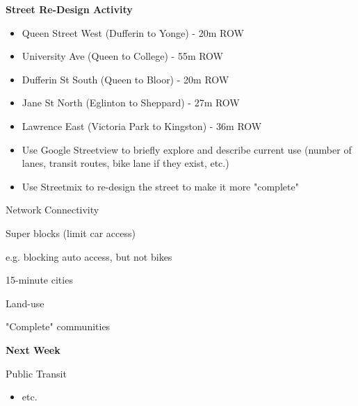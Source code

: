 \documentclass[aspectratio=169]{beamer}
\begin{document}
\begin{frame}
	
	\textbf{Street Re-Design Activity}


	\vspace{4mm}
	
	\begin{itemize}
		\item Queen Street West (Dufferin to Yonge) - 20m ROW
		\item University Ave (Queen to College) - 55m ROW
		\item Dufferin St South (Queen to Bloor) - 20m ROW
		\item Jane St North (Eglinton to Sheppard) - 27m ROW
		\item Lawrence East (Victoria Park to Kingston) - 36m ROW
	\end{itemize}

	
	\vspace{4mm}
	
	
	\begin{itemize}
		\item Use Google Streetview to briefly explore and describe current use (number of lanes, transit routes, bike lane if they exist, etc.)
		\item Use Streetmix to re-design the street to make it more "complete"
	\end{itemize}
	
\end{frame}



\begin{frame}
	
	Network Connectivity
	
\end{frame}



\begin{frame}
	
	Super blocks (limit car access)
	
	e.g. blocking auto access, but not bikes
	
\end{frame}



\begin{frame}
	
	15-minute cities
	
	Land-use
	
	"Complete" communities
		
\end{frame}




\begin{frame}
	\textbf{Next Week} 
	
	\vspace{4mm}
	
	Public Transit
	
	\begin{itemize}
				
		
		\item etc.
				
		
	\end{itemize}
	
\end{frame}
\end{document}
